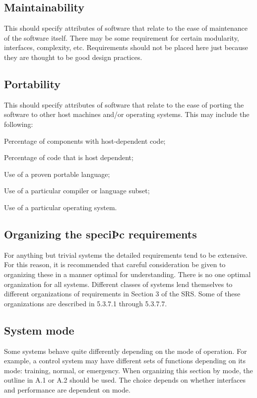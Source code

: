 	\subsection{Maintainability}
		This should specify attributes of software that relate to the ease of maintenance of the software itself. There may be some requirement for certain modularity, interfaces, complexity, etc. Requirements should not be placed here just because they are thought to be good design practices.
	
	\subsection{Portability}
		This should specify attributes of software that relate to the ease of porting the software to other host machines and/or operating systems. This may include the following:
		
		Percentage of components with host-dependent code;
		
		Percentage of code that is host dependent;
		
		Use of a proven portable language; 
		
		Use of a particular compiler or language subset;
		
		Use of a particular operating system.
	
	\subsection{Organizing the speciÞc requirements}
		For anything but trivial systems the detailed requirements tend to be extensive. For this reason, it is recommended that careful consideration be given to organizing these in a manner optimal for understanding. There is no one optimal organization for all systems. Different classes of systems lend themselves to different organizations of requirements in Section 3 of the SRS. Some of these organizations are described in 5.3.7.1 through 5.3.7.7.
	
	\subsection{System mode}
		Some systems behave quite differently depending on the mode of operation. For example, a control system may have different sets of functions depending on its mode: training, normal, or emergency. When organizing this section by mode, the outline in A.1 or A.2 should be used. The choice depends on whether interfaces and performance are dependent on mode.
	
